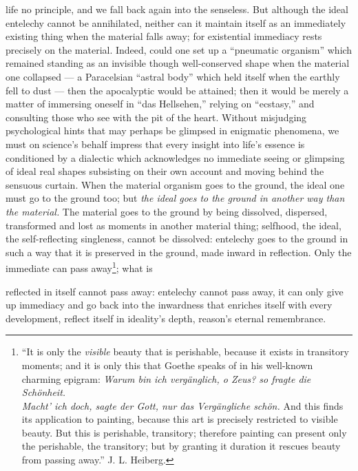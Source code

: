 \documentclass[12pt,a4paper]{book}
\begin{document}
\setcounter{footnote}{0}
life no principle, and we fall back again into the senseless. But although the
ideal entelechy cannot be annihilated, neither can it maintain itself as an
immediately existing thing when the material falls away; for existential
immediacy rests precisely on the material. Indeed, could one set up a
``pneumatic organism'' which remained standing as an invisible though
well-conserved shape when the material one collapsed --- a Paracelsian ``astral
body'' which held itself when the earthly fell to dust --- then the apocalyptic
would be attained; then it would be merely a matter of immersing oneself in
``das Hellsehen,'' relying on ``ecstasy,'' and consulting those who see with the
pit of the heart. Without misjudging psychological hints that may perhaps be
glimpsed in enigmatic phenomena, we must on science's behalf impress that every
insight into life's essence is conditioned by a dialectic which acknowledges no
immediate seeing or glimpsing of ideal real shapes subsisting on their own
account and moving behind the sensuous curtain. When the material organism goes
to the ground, the ideal one must go to the ground too; but \emph{the ideal goes
to the ground in another way than the material.} The material goes to the ground
by being dissolved, dispersed, transformed and lost as moments in another
material thing; selfhood, the ideal, the self-reflecting singleness, cannot be
dissolved: entelechy goes to the ground in such a way that it is preserved in
the ground, made inward in reflection. Only the immediate can pass
away\footnote{``It is only the \emph{visible} beauty that is perishable,
because it exists in transitory moments; and it is only this that Goethe speaks
of in his well-known charming epigram:
\emph{Warum bin ich vergänglich, o Zeus? so fragte die Schönheit.\\
Macht' ich doch, sagte der Gott, nur das Vergängliche schön.}
And this finds its application to painting, because this art is precisely
restricted to visible beauty. But this is perishable, transitory; therefore
painting can present only the perishable, the transitory; but by granting it
duration it rescues beauty from passing away.'' J. L. Heiberg.}; what is

reflected in itself cannot pass away: entelechy cannot pass away, it can only
give up immediacy and go back into the inwardness that enriches itself with
every development, reflect itself in ideality's depth, reason's eternal
remembrance.
\end{document}
